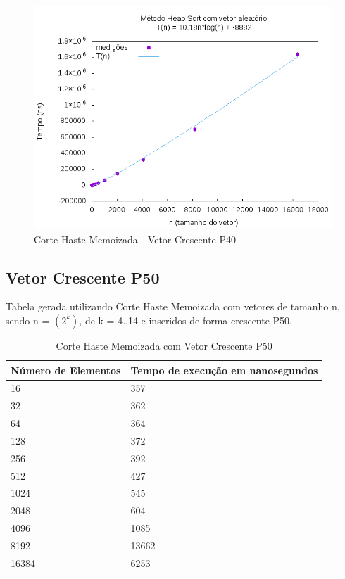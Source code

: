 \documentclass[12pt,a4paper,twoside]{report}
\begin{document}
\begin{figure}[H]
    \centering
    \includegraphics[width=0.7\linewidth]{graficos/HeapSort/vIntAleatorio/vIntAleatorio.png}
  \caption{Corte Haste Memoizada - Vetor Crescente P40}
\end{figure}




\subsection{Vetor Crescente P50}
Tabela gerada utilizando Corte Haste Memoizada com vetores de tamanho n, sendo n = $(2^k)$, de k = 4..14 e inseridos de forma crescente P50.
\begin{table}[H]
\centering
\caption{Corte Haste Memoizada com Vetor Crescente P50}
\label{my-label}
\begin{tabular}{|l|l|}
\hline
\multicolumn{1}{|c|}{\textbf{Número de Elementos}} & \multicolumn{1}{c|}{\textbf{Tempo de execução em nanosegundos}} \\ \hline
16 & 357 \\ \hline
32 & 362 \\ \hline
64 & 364 \\ \hline
128 & 372 \\ \hline
256 & 392 \\ \hline
512 & 427 \\ \hline
1024 & 545 \\ \hline
2048 & 604 \\ \hline
4096 & 1085 \\ \hline
8192 & 13662 \\ \hline
16384 & 6253 \\ \hline
\end{tabular}
\end{table}
\end{document}

